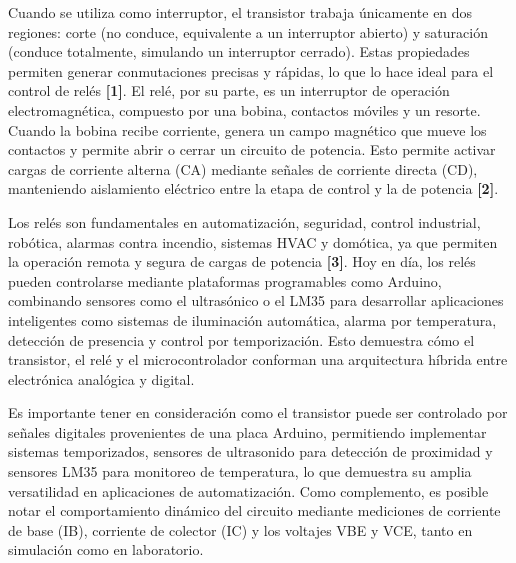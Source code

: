 Cuando se utiliza como interruptor, el transistor trabaja únicamente en dos regiones: corte (no conduce, equivalente a un interruptor abierto) y saturación (conduce totalmente, simulando un interruptor cerrado). Estas propiedades permiten generar conmutaciones precisas y rápidas, lo que lo hace ideal para el control de relés \textbf{[1]}. El relé, por su parte, es un interruptor de operación electromagnética, compuesto por una bobina, contactos móviles y un resorte. Cuando la bobina recibe corriente, genera un campo magnético que mueve los contactos y permite abrir o cerrar un circuito de potencia. Esto permite activar cargas de corriente alterna (CA) mediante señales de corriente directa (CD), manteniendo aislamiento eléctrico entre la etapa de control y la de potencia \textbf{[2]}.

Los relés son fundamentales en automatización, seguridad, control industrial, robótica, alarmas contra incendio, sistemas HVAC y domótica, ya que permiten la operación remota y segura de cargas de potencia \textbf{[3]}. Hoy en día, los relés pueden controlarse mediante plataformas programables como Arduino, combinando sensores como el ultrasónico o el LM35 para desarrollar aplicaciones inteligentes como sistemas de iluminación automática, alarma por temperatura, detección de presencia y control por temporización. Esto demuestra cómo el transistor, el relé y el microcontrolador conforman una arquitectura híbrida entre electrónica analógica y digital.

Es importante tener en consideración como el transistor puede ser controlado por señales digitales provenientes de una placa Arduino, permitiendo implementar sistemas temporizados, sensores de ultrasonido para detección de proximidad y sensores LM35 para monitoreo de temperatura, lo que demuestra su amplia versatilidad en aplicaciones de automatización. Como complemento, es posible notar el comportamiento dinámico del circuito mediante mediciones de corriente de base (IB), corriente de colector (IC) y los voltajes VBE y VCE, tanto en simulación como en laboratorio.

